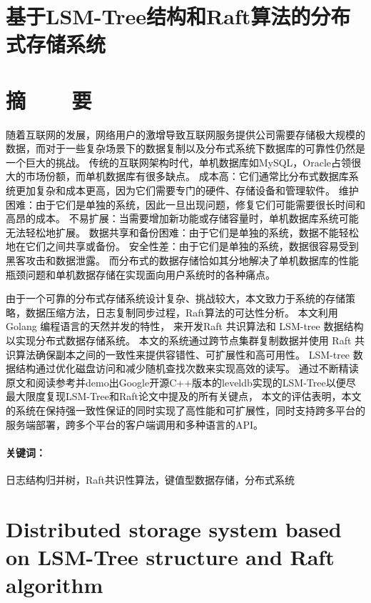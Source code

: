 \section*{基于LSM-Tree结构和Raft算法的分布式存储系统}
\section*{摘\ \ \ \ 要}

随着互联网的发展，网络用户的激增导致互联网服务提供公司需要存储极大规模的数据，而对于一些复杂场景下的数据复制以及分布式系统下数据库的可靠性仍然是一个巨大的挑战。
传统的互联网架构时代，单机数据库如MySQL，Oracle占领很大的市场份额，而单机数据库有很多缺点。
成本高：它们通常比分布式数据库系统更加复杂和成本更高，因为它们需要专门的硬件、存储设备和管理软件。
维护困难：由于它们是单独的系统，因此一旦出现问题，修复它们可能需要很长时间和高昂的成本。
不易扩展：当需要增加新功能或存储容量时，单机数据库系统可能无法轻松地扩展。
数据共享和备份困难：由于它们是单独的系统，数据不能轻松地在它们之间共享或备份。
安全性差：由于它们是单独的系统，数据很容易受到黑客攻击和数据泄露。
而分布式的数据存储恰如其分地解决了单机数据库的性能瓶颈问题和单机数据存储在实现面向用户系统时的各种痛点。


由于一个可靠的分布式存储系统设计复杂、挑战较大，本文致力于系统的存储策略，数据压缩方法，日志复制同步过程，Raft算法的可达性分析。
本文利用 Golang 编程语言的天然并发的特性， 来开发Raft 共识算法和 LSM-tree 数据结构以实现分布式数据存储系统。 
本文的系统通过跨节点集群复制数据并使用 Raft 共识算法确保副本之间的一致性来提供容错性、可扩展性和高可用性。 LSM-tree 数据结构通过优化磁盘访问和减少随机查找次数来实现高效的读写。 
通过不断精读原文和阅读参考并demo出Google开源C++版本的leveldb实现的LSM-Tree以便尽最大限度复现LSM-Tree和Raft论文中提及的所有关键点，
本文的评估表明，本文的系统在保持强一致性保证的同时实现了高性能和可扩展性，同时支持跨多平台的服务端部署，跨多个平台的客户端调用和多种语言的API。

\paragraph{关键词：} 日志结构归并树，Raft共识性算法，键值型数据存储，分布式系统

\clearpage


\section*{Distributed storage system based on LSM-Tree structure and Raft algorithm}

